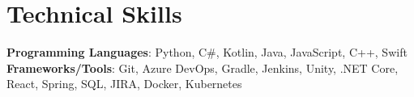 \section{Technical Skills}
 \begin{itemize}[leftmargin=0.15in, label={}]
    \small{\item{
      \textbf{Programming Languages}{: Python, C\#, Kotlin, Java, JavaScript, C++, Swift } \\
     \textbf{Frameworks/Tools}{: Git, Azure DevOps, Gradle, Jenkins, Unity, .NET Core, React, Spring, SQL, JIRA, Docker, Kubernetes }\\
    }}
 \end{itemize}